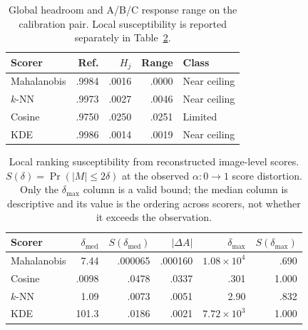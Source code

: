 \documentclass[11pt,a4paper]{article}
\begin{document}
\begin{table}[t]
\centering
\caption{Global headroom and A/B/C response range on the calibration pair. Local susceptibility is reported separately in Table~\ref{tab:susceptibility}.}
\label{tab:headroom}
\small
\begin{tabular}{lrrrl}
\toprule
Scorer & Ref. & $H_j$ & Range & Class\\
\midrule
Mahalanobis & .9984 & .0016 & .0000 & Near ceiling\\
$k$-NN & .9973 & .0027 & .0046 & Near ceiling\\
Cosine & .9750 & .0250 & .0251 & Limited\\
KDE & .9986 & .0014 & .0019 & Near ceiling\\
\bottomrule
\end{tabular}
\end{table}

\begin{table}[t]
\centering
\caption{Local ranking susceptibility from reconstructed image-level scores. $S(\delta)=\Pr(|M|\le2\delta)$ at the observed $\alpha\!:\!0\!\to\!1$ score distortion. Only the $\delta_{\max}$ column is a valid bound; the median column is descriptive and its value is the ordering across scorers, not whether it exceeds the observation.}
\label{tab:susceptibility}
\small
\begin{tabular}{lrrrrr}
\toprule
Scorer & $\delta_{\mathrm{med}}$ & $S(\delta_{\mathrm{med}})$ & $|\Delta A|$ & $\delta_{\max}$ & $S(\delta_{\max})$\\
\midrule
Mahalanobis & 7.44 & .000065 & .000160 & $1.08{\times}10^{4}$ & .690\\
Cosine & .0098 & .0478 & .0337 & .301 & 1.000\\
$k$-NN & 1.09 & .0073 & .0051 & 2.90 & .832\\
KDE & 101.3 & .0186 & .0021 & $7.72{\times}10^{3}$ & 1.000\\
\bottomrule
\end{tabular}
\end{table}
\end{document}
